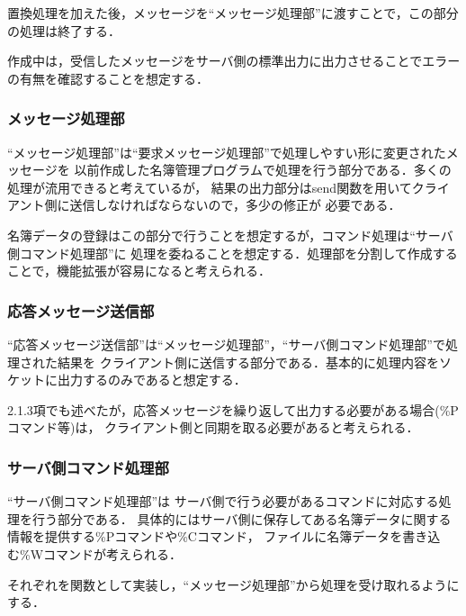 \documentclass[a4paper,11pt]{jarticle}
\begin{document}
置換処理を加えた後，メッセージを``メッセージ処理部''に渡すことで，この部分の処理は終了する．

作成中は，受信したメッセージをサーバ側の標準出力に出力させることでエラーの有無を確認することを想定する．
\subsubsection{メッセージ処理部} \label{sec:send}
``メッセージ処理部''は``要求メッセージ処理部''で処理しやすい形に変更されたメッセージを
以前作成した名簿管理プログラムで処理を行う部分である．多くの処理が流用できると考えているが，
結果の出力部分はsend関数を用いてクライアント側に送信しなければならないので，多少の修正が
必要である．

名簿データの登録はこの部分で行うことを想定するが，コマンド処理は``サーバ側コマンド処理部''に
処理を委ねることを想定する．処理部を分割して作成することで，機能拡張が容易になると考えられる．

\subsubsection{応答メッセージ送信部} \label{sec:recv}

``応答メッセージ送信部''は``メッセージ処理部''，``サーバ側コマンド処理部''で処理された結果を
クライアント側に送信する部分である．基本的に処理内容をソケットに出力するのみであると想定する．

2.1.3項でも述べたが，応答メッセージを繰り返して出力する必要がある場合(\%Pコマンド等)は，
クライアント側と同期を取る必要があると考えられる．

\subsubsection{サーバ側コマンド処理部} \label{sec:command}

``サーバ側コマンド処理部''は
サーバ側で行う必要があるコマンドに対応する処理を行う部分である．
具体的にはサーバ側に保存してある名簿データに関する情報を提供する\%Pコマンドや\%Cコマンド，
ファイルに名簿データを書き込む\%Wコマンドが考えられる．

それぞれを関数として実装し，``メッセージ処理部''から処理を受け取れるようにする．
\end{document}
